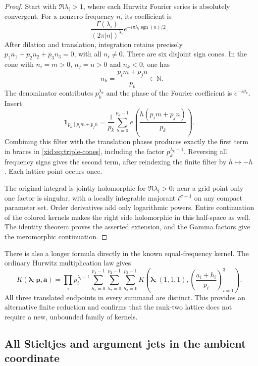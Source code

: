 \begin{proof}
Start with $\Re\lambda_i>1$, where each Hurwitz Fourier series is
absolutely convergent.  For a nonzero frequency $n$, its coefficient
is
\[
 \frac{\Gamma(\lambda_i)}{(2\pi|n|)^{\lambda_i}}
      e^{-i\pi\lambda_i\operatorname{sgn}(n)/2}.
\]
After dilation and translation, integration retains precisely
$p_1n_1+p_2n_2+p_3n_3=0$, with all $n_i\ne0$.
There are six disjoint sign cones.  In the cone with $n_i=m>0$,
$n_j=n>0$ and $n_k<0$, one has
\[
 -n_k=\frac{p_i m+p_j n}{p_k}\in\mathbb N.
\]
The denominator contributes $p_k^{\lambda_k}$ and the phase of
the Fourier coefficient is $e^{-i\vartheta_k}$.  Insert
\[
 \mathbf1_{p_k\mid p_i m+p_j n}
   =\frac1{p_k}\sum_{h=0}^{p_k-1}
                  e\left(\frac{h(p_i m+p_j n)}{p_k}\right).
\]
Combining this filter with the translation phases produces exactly
the first term in braces in \eqref{xid:eq:triple-cones}, including the
factor $p_k^{\lambda_k-1}$.  Reversing all frequency signs gives
the second term, after reindexing the finite filter by $h\mapsto-h$.
Each lattice point occurs once.

The original integral is jointly holomorphic for $\Re\lambda_i>0$:
near a grid point only one factor is singular, with a locally
integrable majorant $t^{\sigma-1}$ on any compact parameter set.
Order derivatives add only logarithmic powers.  Entire continuation
of the colored kernels makes the right side holomorphic in this
half-space as well.  The identity theorem proves the asserted
extension, and the Gamma factors give the meromorphic continuation.
\end{proof}

There is also a longer formula directly in the known equal-frequency
kernel.  The ordinary Hurwitz multiplication law gives
\begin{equation}\label{xid:eq:covering-triple}
 K(\boldsymbol\lambda;\boldsymbol p,\boldsymbol a)
 =\prod_i p_i^{\lambda_i-1}
 \sum_{h_1=0}^{p_1-1}\sum_{h_2=0}^{p_2-1}\sum_{h_3=0}^{p_3-1}
 K\left(\boldsymbol\lambda;(1,1,1),
        \left(\frac{a_i+h_i}{p_i}\right)_{i=1}^3\right).
\end{equation}
All three translated endpoints in every summand are distinct.  This
provides an alternative finite reduction and confirms that the rank-two
lattice does not require a new, unbounded family of kernels.

\subsection{All Stieltjes and argument jets in the ambient coordinate}

